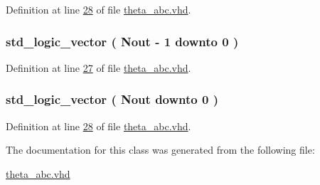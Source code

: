 Definition at line \hyperlink{theta__abc_8vhd_source_l00028}{28} of file \hyperlink{theta__abc_8vhd_source}{theta\+\_\+abc.\+vhd}.

\hypertarget{classtheta__abc_1_1theta__abc_a99d308b4a97dff4ea9faacf3778ac0f1}{}
\subsubsection[{th\+\_\+c}]{ {\bfseries \textcolor{comment}{std\+\_\+logic\+\_\+vector}\textcolor{vhdlchar}{ }\textcolor{vhdlchar}{(}\textcolor{vhdlchar}{ }\textcolor{vhdlchar}{ }\textcolor{vhdlchar}{ }\textcolor{vhdlchar}{ }{\bfseries {\bf Nout}} \textcolor{vhdlchar}{-\/}\textcolor{vhdlchar}{ } \textcolor{vhdldigit}{1} \textcolor{vhdlchar}{ }\textcolor{keywordflow}{downto}\textcolor{vhdlchar}{ }\textcolor{vhdlchar}{ } \textcolor{vhdldigit}{0} \textcolor{vhdlchar}{ }\textcolor{vhdlchar}{)}\textcolor{vhdlchar}{ }} \hspace{0.3cm}{\ttfamily [Signal]}}\label{classtheta__abc_1_1theta__abc_a99d308b4a97dff4ea9faacf3778ac0f1}


Definition at line \hyperlink{theta__abc_8vhd_source_l00027}{27} of file \hyperlink{theta__abc_8vhd_source}{theta\+\_\+abc.\+vhd}.

\hypertarget{classtheta__abc_1_1theta__abc_a45f5cb01816ecd5555fc839e392dfe6a}{}
\subsubsection[{th\+\_\+ci}]{ {\bfseries \textcolor{comment}{std\+\_\+logic\+\_\+vector}\textcolor{vhdlchar}{ }\textcolor{vhdlchar}{(}\textcolor{vhdlchar}{ }\textcolor{vhdlchar}{ }\textcolor{vhdlchar}{ }\textcolor{vhdlchar}{ }{\bfseries {\bf Nout}} \textcolor{vhdlchar}{ }\textcolor{keywordflow}{downto}\textcolor{vhdlchar}{ }\textcolor{vhdlchar}{ } \textcolor{vhdldigit}{0} \textcolor{vhdlchar}{ }\textcolor{vhdlchar}{)}\textcolor{vhdlchar}{ }} \hspace{0.3cm}{\ttfamily [Signal]}}\label{classtheta__abc_1_1theta__abc_a45f5cb01816ecd5555fc839e392dfe6a}


Definition at line \hyperlink{theta__abc_8vhd_source_l00028}{28} of file \hyperlink{theta__abc_8vhd_source}{theta\+\_\+abc.\+vhd}.



The documentation for this class was generated from the following file\+:\begin{DoxyCompactItemize}
\item 
\hyperlink{theta__abc_8vhd}{theta\+\_\+abc.\+vhd}\end{DoxyCompactItemize}
